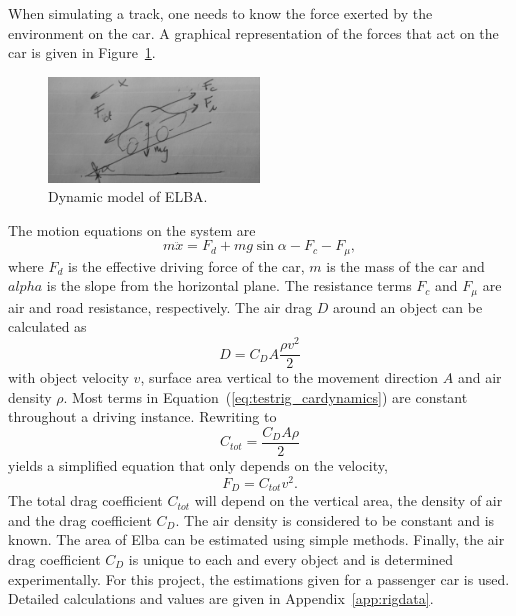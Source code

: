 When simulating a track, one needs to know the force exerted by the environment
on the car. A graphical representation of the forces that act on the car is
given in Figure~\ref{fig:testrig_elbadynamics}.
\begin{figure}[H]
    \label{fig:testrig_elbadynamics}
    \centering
    \includegraphics[width=0.5\textwidth]{./img/testrig_elbadynamics.png}
    \caption{Dynamic model of ELBA.}
\end{figure}
The motion equations on the system are 
\begin{equation} \label{eq:testrig_cardynamics}
    m\ddot{x} = F_d + mg\sin{\alpha} - F_c - F_{\mu},
\end{equation}
where $F_d$ is the effective driving force of the car, $m$ is the mass of the
car and $alpha$ is the slope from the horizontal plane. The resistance terms
$F_c$ and $F_{\mu}$ are air and road resistance, respectively. The air drag $D$
around an object can be calculated as \cite{nakayama2002}
\begin{equation} \label{eq:testrig_airdrag}
    D = C_D A \frac{\rho v^2} {2}
\end{equation}
with object velocity $v$, surface area vertical to the movement direction $A$
and air density $\rho$. Most terms in Equation~(\ref{eq:testrig_cardynamics})
are constant throughout a driving instance. Rewriting to
\begin{equation} \label{eq:testrig_csimple}
    C_{tot} = \frac{C_D A \rho} {2}
\end{equation}
yields a simplified equation that only depends on the velocity,
\begin{equation} \label{eq:drag}
    F_D = C_{tot}v^2.
\end{equation}
The total drag coefficient $C_{tot}$ will depend on the vertical area, the density of
air and the drag coefficient $C_D$. The air density is considered to be constant
and is known. The area of Elba can be estimated using simple methods. Finally,
the air drag coefficient $C_D$ is unique to each and every object and is
determined experimentally. For this project, the estimations given for a
passenger car is used. Detailed calculations and values are given in
Appendix~\ref{app:rigdata}. 

